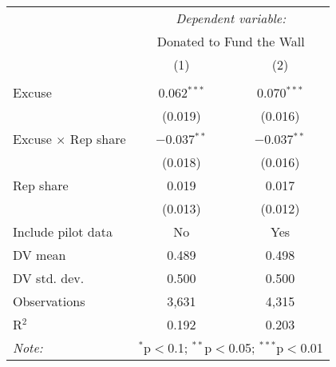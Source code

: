 
\begin{table}[!htbp] \centering 
  \label{t:2-cityheterogeneity-slides} 
\begin{tabular}{@{\hspace{5pt}}l@{\hspace{5pt}}cc} 
\toprule 
 & \multicolumn{2}{c}{\textit{Dependent variable:}} \\ 
\cmidrule(rr){2-3} 
 & \multicolumn{2}{c}{Donated to Fund the Wall} \\ 
 \cmidrule(rr){2-3}
 & (1) & (2)\\ 
\midrule  
\\[-2.1ex] Excuse & 0.062$^{***}$ & 0.070$^{***}$ \\ 
  & (0.019) & (0.016) \\ 
 \addlinespace 
 Excuse $\times$ Rep share & $-$0.037$^{**}$ & $-$0.037$^{**}$ \\ 
  & (0.018) & (0.016) \\ 
 \addlinespace 
 Rep share & 0.019 & 0.017 \\ 
  & (0.013) & (0.012) \\ 
 \addlinespace 
\midrule  
\midrule
Include pilot data & No & Yes \\
DV mean & 0.489 & 0.498 \\
DV std. dev. & 0.500 & 0.500 \\
Observations & 3,631 & 4,315 \\ 
R$^{2}$ & 0.192 & 0.203 \\ 
\bottomrule 
\textit{Note:}  & \multicolumn{2}{r}{$^{*}$p$<$0.1; $^{**}$p$<$0.05; $^{***}$p$<$0.01} \\ 
\end{tabular} 
\end{table} 
